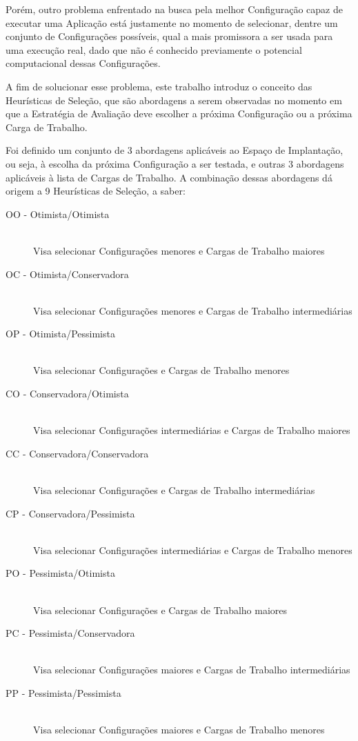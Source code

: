 \documentclass[12pt]{article}
\begin{document}
Porém, outro problema enfrentado na busca pela melhor Configuração capaz de executar 
uma Aplicação está justamente no momento de selecionar, dentre um conjunto de 
Configurações possíveis, qual a mais promissora a ser usada para uma execução real, 
dado que não é conhecido previamente o potencial computacional dessas Configurações.

A fim de solucionar esse problema, este trabalho introduz o conceito das 
Heurísticas de Seleção, que são abordagens a serem observadas no momento em que
a Estratégia de Avaliação deve escolher a próxima Configuração ou a próxima Carga 
de Trabalho. 

Foi definido um conjunto de 3 abordagens aplicáveis ao Espaço de Implantação,
ou seja, à escolha da próxima Configuração a ser testada, e outras 3 abordagens
aplicáveis à lista de Cargas de Trabalho. A combinação dessas abordagens dá origem
a 9 Heurísticas de Seleção, a saber:

\begin{samepage}
\begin{description}
  \item[OO - Otimista/Otimista] \hfill \\ Visa selecionar Configurações menores e Cargas de Trabalho maiores
  \item[OC - Otimista/Conservadora] \hfill \\ Visa selecionar Configurações menores e Cargas de Trabalho intermediárias
  \item[OP - Otimista/Pessimista] \hfill \\ Visa selecionar Configurações e Cargas de Trabalho menores
  \item[CO - Conservadora/Otimista] \hfill \\ Visa selecionar Configurações intermediárias e Cargas de Trabalho maiores
  \item[CC - Conservadora/Conservadora] \hfill \\ Visa selecionar Configurações e Cargas de Trabalho intermediárias
  \item[CP - Conservadora/Pessimista] \hfill \\ Visa selecionar Configurações intermediárias e Cargas de Trabalho menores
  \item[PO - Pessimista/Otimista] \hfill \\ Visa selecionar Configurações e Cargas de Trabalho maiores
  \item[PC - Pessimista/Conservadora] \hfill \\ Visa selecionar Configurações maiores e Cargas de Trabalho intermediárias
  \item[PP - Pessimista/Pessimista] \hfill \\ Visa selecionar Configurações maiores e Cargas de Trabalho menores
\end{description}
\end{samepage}
\end{document}
